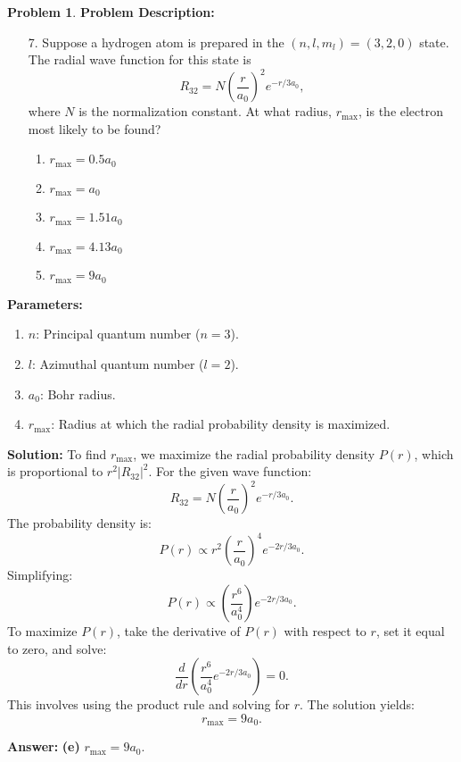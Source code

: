 \documentclass[12pt]{article}
\theoremstyle{definition} %
\newtheorem{problem}{Problem}
\theoremstyle{plain} %
\begin{document}
\begin{problem}
    \textbf{Problem Description:}
\begin{enumerate}
    \item[7.] Suppose a hydrogen atom is prepared in the \((n, l, m_l) = (3, 2, 0)\) state. The radial wave function for this state is 
    $$
    R_{32} = N \left(\frac{r}{a_0}\right)^2 e^{-r / 3a_0},
    $$
    where \(N\) is the normalization constant. At what radius, \(r_{\text{max}}\), is the electron most likely to be found?
    \begin{enumerate}
        \item \(r_{\text{max}} = 0.5a_0\)
        \item \(r_{\text{max}} = a_0\)
        \item \(r_{\text{max}} = 1.51a_0\)
        \item \(r_{\text{max}} = 4.13a_0\)
        \item \(r_{\text{max}} = 9a_0\)
    \end{enumerate}
\end{enumerate}

\textbf{Parameters:}
\begin{enumerate}
    \item \(n\): Principal quantum number (\(n = 3\)).
    \item \(l\): Azimuthal quantum number (\(l = 2\)).
    \item \(a_0\): Bohr radius.
    \item \(r_{\text{max}}\): Radius at which the radial probability density is maximized.
\end{enumerate}

\textbf{Solution:}
To find \(r_{\text{max}}\), we maximize the radial probability density \(P(r)\), which is proportional to \(r^2 |R_{32}|^2\). For the given wave function:
$$
R_{32} = N \left(\frac{r}{a_0}\right)^2 e^{-r / 3a_0}.
$$
The probability density is:
$$
P(r) \propto r^2 \left(\frac{r}{a_0}\right)^4 e^{-2r / 3a_0}.
$$
Simplifying:
$$
P(r) \propto \left(\frac{r^6}{a_0^4}\right) e^{-2r / 3a_0}.
$$
To maximize \(P(r)\), take the derivative of \(P(r)\) with respect to \(r\), set it equal to zero, and solve:
$$
\frac{d}{dr}\left(\frac{r^6}{a_0^4} e^{-2r / 3a_0}\right) = 0.
$$
This involves using the product rule and solving for \(r\). The solution yields:
$$
r_{\text{max}} = 9a_0.
$$

\textbf{Answer:} \textbf{(e)} \(r_{\text{max}} = 9a_0\).

\end{problem}
\end{document}
